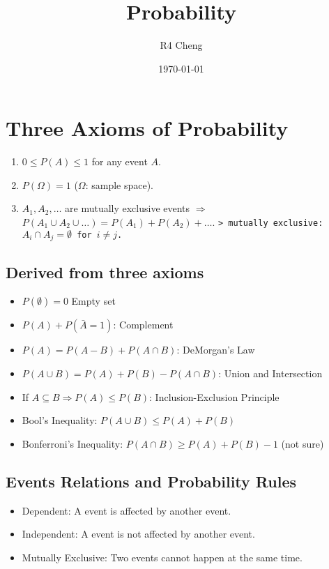 \documentclass[12pt,a4paper]{article}
\title{Probability}
\author{R4 Cheng}
\date{\today}
\begin{document}
\maketitle

\section*{Three Axioms of Probability}

\begin{enumerate}
    \item $0 \leq P(A) \leq 1$ for any event $A$.
    \item $P(\Omega) = 1$ ($\Omega$: sample space).
    \item $A_1, A_2, \dots$ are mutually exclusive events $\Rightarrow$ $P(A_1 \cup A_2 \cup \dots) = P(A_1) + P(A_2) + \dots$.
    \texttt{> mutually exclusive: $A_i \cap A_j = \emptyset$ for $i \neq j$.}
\end{enumerate}

\subsection*{Derived from three axioms}

\begin{itemize}
    \item $P(\emptyset) = 0$ Empty set
    \item $P(A) + P(\bar{A} = 1)$: Complement
    \item $P(A) = P(A - B) + P(A \cap B)$: DeMorgan's Law
    \item $P(A \cup B) = P(A) + P(B) - P(A \cap B)$: Union and Intersection
    \item If $A \subseteq B \Rightarrow P(A) \leq P(B)$: Inclusion-Exclusion Principle
    \item Bool's Inequality: $P(A \cup B) \leq P(A) + P(B)$
    \item Bonferroni's Inequality: $P(A \cap B) \geq P(A) + P(B) - 1$ (not sure)
\end{itemize}

\subsection*{Events Relations and Probability Rules}

\begin{itemize}
  \item Dependent: A event is affected by another event.
  \item Independent: A event is not affected by another event.
  \item Mutually Exclusive: Two events cannot happen at the same time.
\end{itemize}
\end{document}
